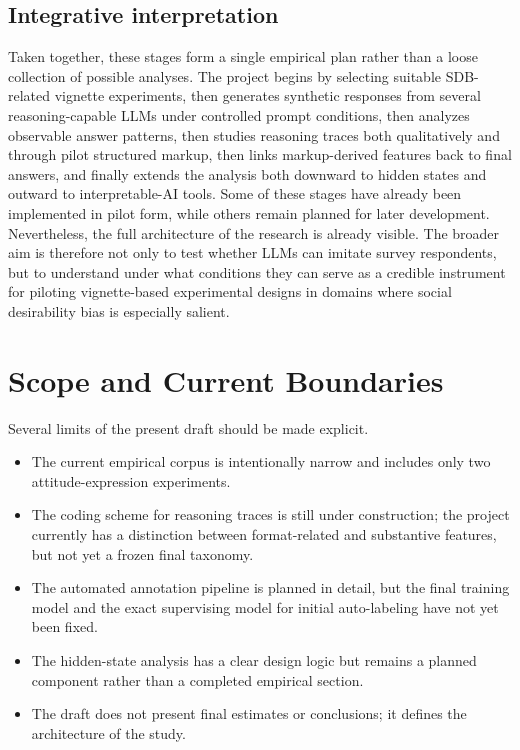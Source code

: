 \documentclass[14pt,a4paper]{extarticle}
\begin{document}
\subsection{Integrative interpretation}

Taken together, these stages form a single empirical plan rather than a loose collection of possible analyses. The project begins by selecting suitable SDB-related vignette experiments, then generates synthetic responses from several reasoning-capable LLMs under controlled prompt conditions, then analyzes observable answer patterns, then studies reasoning traces both qualitatively and through pilot structured markup, then links markup-derived features back to final answers, and finally extends the analysis both downward to hidden states and outward to interpretable-AI tools. Some of these stages have already been implemented in pilot form, while others remain planned for later development. Nevertheless, the full architecture of the research is already visible. The broader aim is therefore not only to test whether LLMs can imitate survey respondents, but to understand under what conditions they can serve as a credible instrument for piloting vignette-based experimental designs in domains where social desirability bias is especially salient.

\section{Scope and Current Boundaries}

Several limits of the present draft should be made explicit.

\begin{itemize}
    \item The current empirical corpus is intentionally narrow and includes only two attitude-expression experiments.
    \item The coding scheme for reasoning traces is still under construction; the project currently has a distinction between format-related and substantive features, but not yet a frozen final taxonomy.
    \item The automated annotation pipeline is planned in detail, but the final training model and the exact supervising model for initial auto-labeling have not yet been fixed.
    \item The hidden-state analysis has a clear design logic but remains a planned component rather than a completed empirical section.
    \item The draft does not present final estimates or conclusions; it defines the architecture of the study.
\end{itemize}
\end{document}
